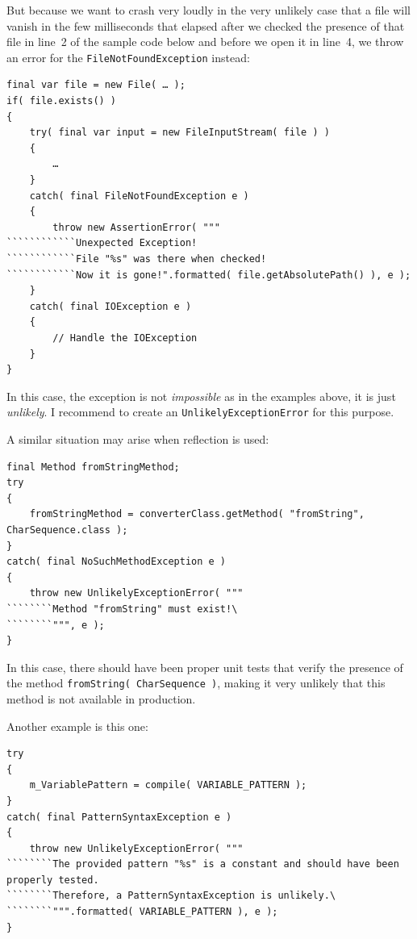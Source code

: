 But because we want to crash very loudly in the very unlikely case that a file will vanish in the few milliseconds that elapsed after we checked the presence of that file in line~2 of the sample code below and before we open it in line~4, we throw an error for the \lstinline|FileNotFoundException| instead:
\begin{lstlisting}
final var file = new File( … );
if( file.exists() )
{
    try( final var input = new FileInputStream( file ) )
    {
        …
    }
    catch( final FileNotFoundException e )
    {
        throw new AssertionError( """
````````````Unexpected Exception!
````````````File "%s" was there when checked!
````````````Now it is gone!".formatted( file.getAbsolutePath() ), e );
    }
    catch( final IOException e )
    {
        // Handle the IOException
    }
}
\end{lstlisting}

In this case, the exception is not \textit{impossible} as in the examples above, it is just \textit{unlikely}. I recommend to create an \lstinline|UnlikelyExceptionError| for this purpose.

A similar situation may arise when reflection is used:
\begin{lstlisting}
final Method fromStringMethod;
try
{
    fromStringMethod = converterClass.getMethod( "fromString", CharSequence.class );
}    
catch( final NoSuchMethodException e )
{
    throw new UnlikelyExceptionError( """
````````Method "fromString" must exist!\
````````""", e );
}
\end{lstlisting}

In this case, there should have been proper unit tests that verify the presence of the method \lstinline|fromString( CharSequence )|, making it very unlikely that this method is not available in production.

Another example is this one:
\begin{lstlisting}
try
{
    m_VariablePattern = compile( VARIABLE_PATTERN );
}
catch( final PatternSyntaxException e )
{
    throw new UnlikelyExceptionError( """
````````The provided pattern "%s" is a constant and should have been properly tested. 
````````Therefore, a PatternSyntaxException is unlikely.\
````````""".formatted( VARIABLE_PATTERN ), e );
}
\end{lstlisting}

